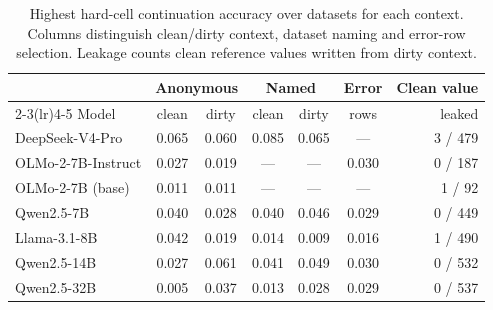 \begin{table}[t]
  \caption{Highest hard-cell continuation accuracy over datasets for each context.
  Columns distinguish clean/dirty context, dataset naming and error-row selection.
  Leakage counts clean reference values written from dirty context.}
  \label{tab:p1}
  \small
  \setlength{\tabcolsep}{2.5pt}
  \begin{tabular}{@{}lcccccr@{}}
    \toprule
    & \multicolumn{2}{c}{Anonymous} & \multicolumn{2}{c}{Named} & Error & Clean value \\
    \cmidrule(lr){2-3}\cmidrule(lr){4-5}
    Model & clean & dirty & clean & dirty & rows & leaked \\
    \midrule
    DeepSeek-V4-Pro & 0.065 & 0.060 & 0.085 & 0.065 & --- & 3 / 479 \\
    OLMo-2-7B-Instruct & 0.027 & 0.019 & --- & --- & 0.030 & 0 / 187 \\
    OLMo-2-7B (base) & 0.011 & 0.011 & --- & --- & --- & 1 / 92 \\
    Qwen2.5-7B & 0.040 & 0.028 & 0.040 & 0.046 & 0.029 & 0 / 449 \\
    Llama-3.1-8B & 0.042 & 0.019 & 0.014 & 0.009 & 0.016 & 1 / 490 \\
    Qwen2.5-14B & 0.027 & 0.061 & 0.041 & 0.049 & 0.030 & 0 / 532 \\
    Qwen2.5-32B & 0.005 & 0.037 & 0.013 & 0.028 & 0.029 & 0 / 537 \\
    \bottomrule
  \end{tabular}
\end{table}
